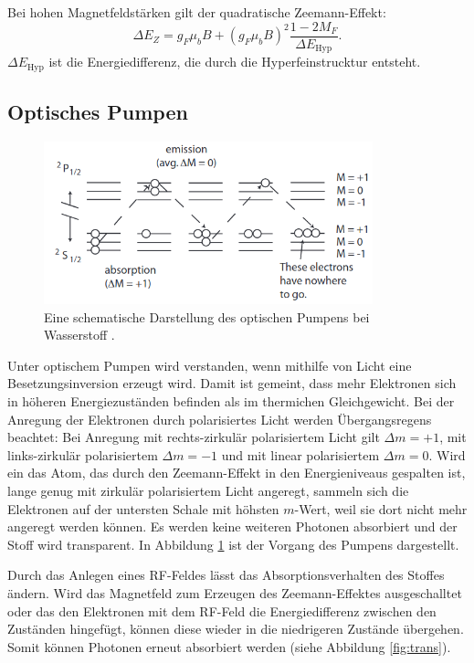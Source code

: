 \noindent Bei hohen Magnetfeldstärken gilt der quadratische Zeemann-Effekt:
\begin{equation}
    \Delta E_Z = g_F \mu_b B +  
    \left(g_F \mu_b B \right)^2 \frac{1 -2 M_F}{\Delta E_\text{Hyp}}.
\end{equation}
\noindent $\Delta E_\text{Hyp}$ ist die Energiedifferenz,
die durch die Hyperfeinstrucktur entsteht.

\subsection{Optisches Pumpen}
\begin{figure}[h!]
    \centering
    \includegraphics[width=0.85\textwidth]{Fotos/pumpen.png}
    \caption{Eine schematische Darstellung 
    des optischen Pumpens bei Wasserstoff \cite{pumpen_caltech}.}
    \label{fig:pumpen}
\end{figure}

Unter optischem Pumpen wird verstanden,
wenn mithilfe von Licht eine Besetzungsinversion erzeugt wird.
Damit ist gemeint, 
dass mehr Elektronen sich in höheren Energiezuständen befinden 
als im thermichen Gleichgewicht.
Bei der Anregung der Elektronen 
durch polarisiertes Licht werden Übergangsregens beachtet:
Bei Anregung mit rechts-zirkulär polarisiertem Licht gilt $\Delta m = +1$,
mit links-zirkulär polarisiertem $\Delta m = -1$
und mit linear polarisiertem $\Delta m = 0$.
Wird ein das Atom, 
das durch den Zeemann-Effekt in den Energieniveaus gespalten ist,
lange genug mit zirkulär polarisiertem Licht angeregt,
sammeln sich die Elektronen auf der untersten Schale mit höhsten $m$-Wert,
weil sie dort nicht mehr angeregt werden können. 
Es werden keine weiteren Photonen absorbiert 
und der Stoff wird transparent.
In Abbildung \ref{fig:pumpen} ist der Vorgang des Pumpens dargestellt.
\newline \newline

\noindent Durch das Anlegen eines RF-Feldes lässt das Absorptionsverhalten des Stoffes ändern.
Wird das Magnetfeld zum Erzeugen des Zeemann-Effektes ausgeschalltet oder das den
Elektronen mit dem RF-Feld die Energiedifferenz zwischen den Zuständen hingefügt,
können diese wieder in die niedrigeren Zustände übergehen.
Somit können Photonen erneut absorbiert werden (siehe Abbildung \ref{fig:trans}).

